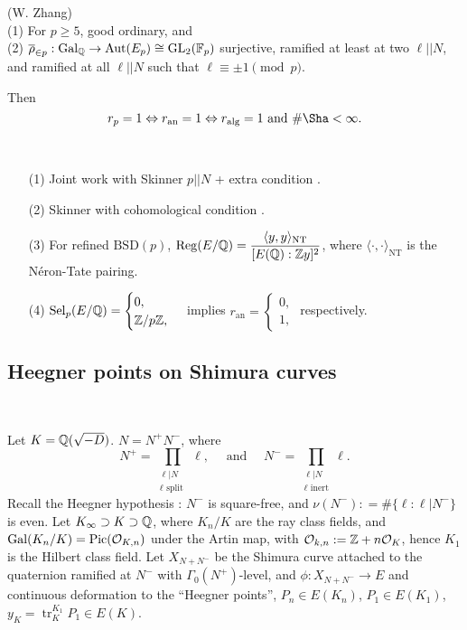 \documentclass[12pt,amsfont]{amsart}
\begin{document}
\begin{thm} (W. Zhang) \\
(1) For $p \geq 5$, good ordinary, and \\
(2) $\overline{\rho}_{\in p} : \operatorname{Gal}_{\mathbb Q} \rightarrow \operatorname{Aut}(E_p) \cong \operatorname{GL}_2({\mathbb F}_p)$ surjective, ramified at least at two $\ell || N$, and ramified at all $\ell || N$ such that $\ell \equiv \pm 1 \pmod{p}$. 

Then
\[r_p = 1 \Leftrightarrow r_{\text{an}} = 1 \Leftrightarrow r_{\text{alg}} = 1 \text{ and } \#\Sha < \infty.\]
\end{thm}

\begin{rmk} 
{\ }
\begin{enumerate}
\item[(1)] 
Joint work with Skinner $p || N$ + extra condition .
\item[(2)]
Skinner with cohomological condition .
\item[(3)]
For refined $\text{BSD}(p)$, $\displaystyle \operatorname{Reg}(E/{\mathbb Q}) = \frac{\langle y, y \rangle_{\text{NT}}}{[E({\mathbb Q}) : {\mathbb Z} y]^2}$, where $\langle \cdot, \cdot\rangle_{\text{NT}}$ is the N\'{e}ron-Tate pairing. 
\item[(4)]
$\operatorname{Sel}_p(E/{\mathbb Q}) = \begin{cases} 0, \\ {\mathbb Z}/p{\mathbb Z}, \end{cases}$ implies $ r_{\text{an}} = \begin{cases} 0, \\ 1, \end{cases}$ respectively. 
\end{enumerate}
\end{rmk}

\subsection{Heegner points on Shimura curves} 
{\ }

Let $K = {\mathbb Q}(\sqrt{-D})$. $N = N^+ N^{-}$, where
\[N^+ = \displaystyle \prod_{\substack{\ell | N \\ \ell \text{ split }}} \ell,\quad  \text{ and }\quad \displaystyle N^{-} = \prod_{\substack{\ell | N \\ \ell \text{ inert}}} \ell.\]
Recall the Heegner hypothesis : $N^{-}$ is square-free, and $\nu(N^{-}): = \# \{\ell : \ell | N^{-}\}$ is even. Let $K_\infty \supset K \supset {\mathbb Q}$, where $K_n/K$ are the ray class fields, and  $\operatorname{Gal}(K_n/K) = \operatorname{Pic}(\mathcal{O}_{K, n})$ under the Artin map, with $\mathcal{O}_{k, n}:= {\mathbb Z} + n \mathcal{O}_K$, hence $K_1$ is the Hilbert class field.  Let $X_{N+ N^{-}} $ be the Shimura curve attached to the quaternion ramified at $N^{-}$ with $\Gamma_0(N^+)$-level, and $\phi: X_{N+ N^{-}}  \to E$ and continuous deformation to the ``Heegner points'', $P_n \in E(K_n)$, $P_1 \in E(K_1)$, $y_K = \operatorname{tr}_K^{K_1} P_1 \in E(K)$. 
\end{document}
